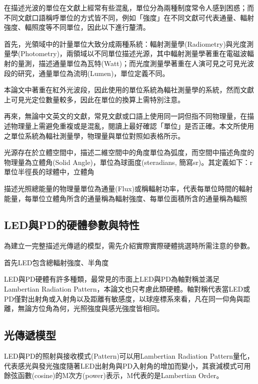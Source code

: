         在描述光波的單位在文獻上經常有些混亂，單位分為兩種制度常令人感到困惑；而不同文獻口語稱呼單位的方式皆不同，例如「強度」在不同文獻可代表通量、輻射強度、輻照度等不同單位，因此以下進行釐清。
        
        首先，光領域中的計量單位大致分成兩種系統：輻射測量學(Radiometry)與光度測量學(Photometry)，兩領域以不同單位描述光源，其中輻射測量學著重在電磁波輻射的量測，描述通量單位為瓦特(Watt)；而光度測量學著重在人演可見之可見光波段的研究，通量單位為流明(Lumen)，單位定義不同。
        
        本論文中著重在紅外光波段，因此使用的單位系統為輻社測量學的系統，然而文獻上可見光定位數量較多，因此在單位的換算上需特別注意。
        
        再來，無論中文英文的文獻，常見文獻或口語上使用同一詞但指不同物理量，在描述物理量上需避免重複或是混亂，閱讀上最好確認「單位」是否正確。本文所使用之單位系統為輻社測量學，物理量與單位對照如表格所示。

        光源存在於立體空間中，描述二維空間中的角度單位為弧度，而空間中描述角度的物理量為立體角(Solid Angle)，單位為球面度(steradians, 簡寫sr)。其定義如下：r單位半徑長的球體中，立體角

        描述光照總能量的物理量單位為通量(Flux)或稱輻射功率，代表每單位時間的輻射能量，每單位立體角所含的通量稱為輻射強度、每單位面積所含的通量稱為輻照

    \subsection{LED與PD的硬體參數與特性}

        為建立一完整描述光傳遞的模型，需先介紹實際實際硬體挑選時所需注意的參數。

        首先LED包含總輻射強度、半角度
        
        LED與PD硬體有許多種類，最常見的市面上LED與PD為軸對稱並滿足Lambertian Radiation Pattern，本論文也只考慮此類硬體。軸對稱代表當LED或PD僅對出射角或入射角以及距離有敏感度，以球座標系來看，凡在同一仰角與距離，無論方位角為何，光照強度與感光強度皆相同。

    \subsection{光傳遞模型}

        LED與PD的照射與接收模式(Pattern)可以用Lambertian Radiation Pattern量化，代表感光與發光強度隨著LED出射角與PD入射角的增加而變小，其衰減模式可用餘弦函數(cosine)的M次方(power)表示，M代表的是Lambertian Order。

